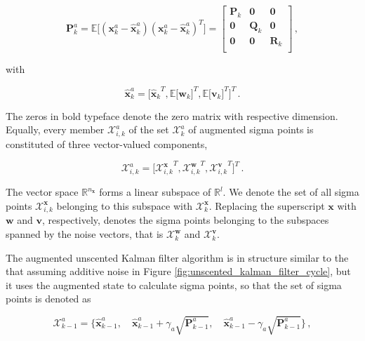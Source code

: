  \begin{equation}
  \bm{P}^a_k = \mathbb{E}\big[(\bm{x}^a_{k} - \hat{\bm{x}}^a_{k}) (\bm{x}^a_{k} - \hat{\bm{x}}^a_{k})^T\big] = \begin{bmatrix}
  \bm{P}_k & \bm{0} & \bm{0} \\
  \bm{0} & \bm{Q}_k & \bm{0} \\
  \bm{0} & \bm{0} & \bm{R}_k \\
\end{bmatrix}\,,
\end{equation}

\noindent
with

\begin{equation}
  \hat{\bm{x}}^a_k = \bigg[{\hat{\bm{x}}_k}^T, \mathbb{E}\big[{\bm{w}_k}\big]^T, \mathbb{E}\big[{\bm{v}_{k}}\big]^T \bigg]^T\,.
\end{equation}

\noindent
The zeros in bold typeface denote the zero matrix with respective dimension. Equally, every member $\mathcal{X}^{a}_{i, k}$ of the set $\bm{\mathcal{X}}^{a}_{k}$ of augmented sigma points is constituted of three vector-valued components,
 
\begin{equation}
   \mathcal{X}^{a}_{i, k} = \Big[{\mathcal{X}^{\bm{x}}_{i, k}}^T, {\mathcal{X}^{\bm{w}}_{i, k}}^T, {\mathcal{X}^{\bm{v}}_{i, k}}^T \Big]^T\,.
\end{equation}

\noindent
The vector space $\mathbb{R}^{n_{\bm{x}}}$ forms a linear subspace of $\mathbb{R}^{l}$. We denote the set of all sigma points $\mathcal{X}^{\bm{x}}_{i, k}$ belonging to this subspace with ${\bm{\mathcal{X}}^{\bm{x}}_{k}}$. Replacing the superscript $\bm{x}$ with $\bm{w}$ and $\bm{v}$, respectively, denotes the sigma points belonging to the subspaces spanned by the noise vectors, that is ${\bm{\mathcal{X}}^{\bm{w}}_{k}}$ and ${\bm{\mathcal{X}}^{\bm{v}}_{k}}$.

The augmented unscented Kalman filter algorithm is in structure similar to the that assuming additive noise in Figure \ref{fig:unscented_kalman_filter_cycle}, but it uses the augmented state to calculate sigma points, so that the set of sigma points is denoted as

\begin{equation}
  \bm{\mathcal{X}}^a_{k-1} = \Big\{\hat{\bm{x}}^a_{k-1}, \quad \hat{\bm{x}}^a_{k-1} + \gamma_a \sqrt{\bm{P}^a_{k-1}}, \quad \hat{\bm{x}}^a_{k-1} - \gamma_a \sqrt{\bm{P}^a_{k-1}}\Big\}\,,
\end{equation}

